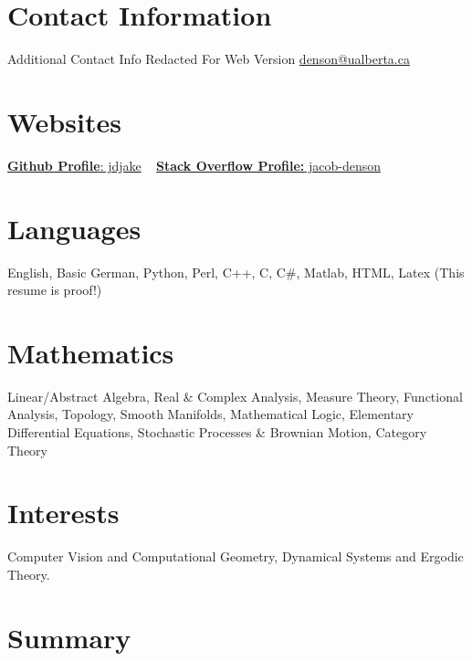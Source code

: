 \documentclass{friggeri-cv} %
\begin{document}


\begin{aside} %
\section{Contact Information}
Additional Contact Info Redacted For Web Version
\href{mailto:denson@ualberta.ca}{denson@ualberta.ca}
\section{Websites}
\href{https://github.com/jdjake}{{\bf Github Profile}: jdjake}
~
\href{http://stackoverflow.com/users/2601483/jacob-denson}{{\bf Stack Overflow Profile:} jacob-denson}
~
\section{Languages}
English, Basic German,
Python, Perl, C++, C, C\#, Matlab, HTML, Latex (This resume is proof!)
\section{Mathematics}
Linear/Abstract Algebra, Real \& Complex Analysis, Measure Theory, Functional Analysis, Topology, Smooth Manifolds, Mathematical Logic, Elementary Differential Equations, Stochastic Processes \& Brownian Motion, Category Theory
\section{Interests}
Computer Vision and Computational Geometry, Dynamical Systems and Ergodic Theory.
\end{aside}


\section{Summary}
\end{document}
